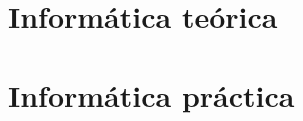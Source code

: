 \documentclass{book}
\begin{document}









\part{Informática teórica}





 

\part{Informática práctica}






\printbibliography
\nocite{*}
\end{document}
